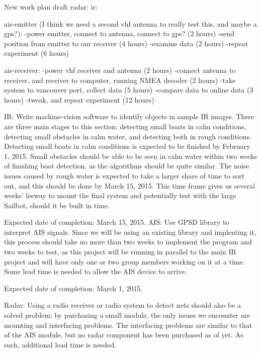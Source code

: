 New work plan draft
radar:
ir:


ais-emitter (I think we need a second vhf antenna to really test this, and maybe a gps?):
-power emitter, connect to antenna, connect to gps? (2 hours)
-send position from emitter to our receiver (4 hours)
-examine data (2 hours)
-repeat experiment (6 hours)

ais-receiver:
-power vhf receiver and antenna (2 hours)
-connect antenna to receiver, and receiver to computer, running NMEA decoder (2 hours)
-take system to vancouver port, collect data (5 hours)
-compare data to online data (3 hours)
-tweak, and repeat experiment (12 hours)



IR:
Write machine-vision software to identify objects in sample IR images. There are three main stages to this section: detecting small boats in calm conditions, detecting small obstacles in calm water, and detecting both in rough conditions. Detecting small boats in calm conditions is expected to be finished by February 1, 2015. Small obstacles should be able to be seen in calm water within two weeks of finishing boat detection, as the algorithms should be quite similar. The noise issues caused by rough water is expected to take a larger share of time to sort out, and this should be done by March 15, 2015. This time frame gives us several weeks' leeway to mount the final system and potentially test with the large Sailbot, should it be built in time.

Expected date of completion: March 15, 2015. \newline\newline
AIS:
Use GPSD library to interpret AIS signals. Since we will be using an existing library and implenting it, this process should take no more than two weeks to implement the program and two weeks to test, as this project will be running in parallel to the main IR project and will have only one or two group members working on it at a time. Some lead time is needed to allow the AIS device to arrive.

Expected date of completion: March 1, 2015.\newline


Radar:
Using a radio receiver or radio system to detect nets should also be a solved problem; by purchasing a small module, the only issues we encounter are mounting and interfacing problems. The interfacing problems are similar to that of the AIS module, but no radar component has been purchased as of yet. As such, additional lead time is needed.

